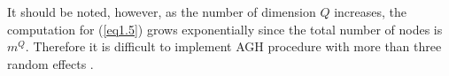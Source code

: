 	It should be noted, however, as the number of dimension $Q$ increases, the computation for (\ref{eq1.5}) grows exponentially since the total number of nodes is $m^Q$.  Therefore it is difficult to implement AGH procedure with more than three random effects \citep{bolker2009generalized}.

